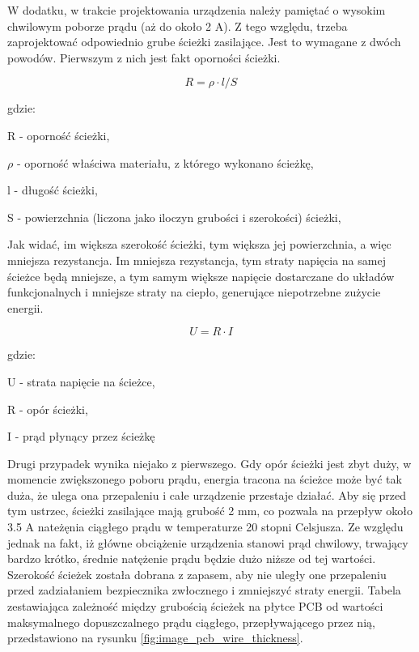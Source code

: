 W dodatku, w trakcie projektowania urządzenia należy pamiętać o wysokim chwilowym poborze prądu (aż do około 2 A). Z tego względu, trzeba zaprojektować odpowiednio grube ścieżki zasilające. Jest to wymagane z dwóch powodów. Pierwszym z nich jest fakt oporności ścieżki.

\begin{equation}
 R = \rho \cdot l / S 
 \label{eq_pcb_wire_resistance}
\end{equation}

gdzie:

R - oporność ścieżki,

$\rho$ - oporność właściwa materiału, z którego wykonano ścieżkę,

l - długość ścieżki,

S - powierzchnia (liczona jako iloczyn grubości i szerokości) ścieżki,

Jak widać, im większa szerokość ścieżki, tym większa jej powierzchnia, a więc mniejsza rezystancja. Im mniejsza rezystancja, tym straty napięcia na samej ścieżce będą mniejsze, a tym samym większe napięcie dostarczane do układów funkcjonalnych i mniejsze straty na ciepło, generujące niepotrzebne zużycie energii.

\begin{equation}
 U = R \cdot I
 \label{eq_voltage_drop_on_pcb_wire} 
\end{equation}

 gdzie:
 
 U - strata napięcie na ścieżce,
 
 R - opór ścieżki,
 
 I - prąd płynący przez ścieżkę
 
\clearpage
Drugi przypadek wynika niejako z pierwszego. Gdy opór ścieżki jest zbyt duży, w momencie zwiększonego poboru prądu, energia tracona na ścieżce może być tak duża, że ulega ona przepaleniu i całe urządzenie przestaje działać. Aby się przed tym ustrzec, ścieżki zasilające mają grubość 2 mm, co pozwala na przepływ około 3.5 A nateżęnia ciągłego prądu w temperaturze 20 stopni Celsjusza. Ze względu jednak na fakt, iż główne obciążenie urządzenia stanowi prąd chwilowy, trwający bardzo krótko, średnie natężenie prądu będzie dużo niższe od tej wartości. Szerokość ścieżek została dobrana z zapasem, aby nie uległy one przepaleniu przed zadziałaniem bezpiecznika zwłocznego i zmniejszyć straty energii. Tabela zestawiająca zależność między grubością ścieżek na płytce PCB od wartości maksymalnego dopuszczalnego prądu ciągłego, przepływającego przez nią, przedstawiono na rysunku \ref{fig:image_pcb_wire_thickness}.

